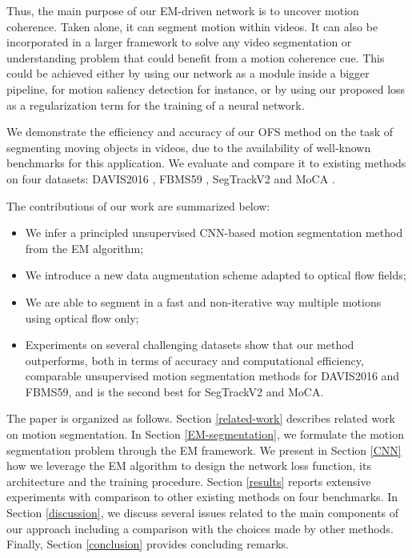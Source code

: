 \documentclass[10pt,twocolumn,letterpaper]{article}
\begin{document}
Thus, the main purpose of our EM-driven network is to uncover motion coherence. Taken alone, it can segment motion within videos. It can also be incorporated in a larger framework to solve any video segmentation or understanding problem {\color{black} that could benefit from a motion coherence cue. This could be achieved either by using our network as a module inside a bigger pipeline, for motion saliency detection for instance, or by using our proposed loss as a regularization term for the training of a neural network.}

We demonstrate the efficiency and accuracy of our OFS method on the task of segmenting moving objects in videos,
due to the availability of well-known benchmarks for this application.
We evaluate and compare it to existing methods on four datasets: DAVIS2016 \cite{pont-tuset_benchmark_2016}, FBMS59 \cite{ochs2014}, SegTrackV2 \cite{li-SegTrackv2-2013} and MoCA \cite{lamdouar_camouflage_2020}.

The contributions of our work are summarized below:
\begin{itemize}
\item We infer a principled unsupervised CNN-based motion segmentation method from the EM algorithm;
\item We introduce a new data augmentation scheme adapted to optical flow fields;
\item We are able to segment in a fast and non-iterative way multiple motions using optical flow only;
\item Experiments on several challenging datasets show that our method outperforms, both in terms of accuracy and computational efficiency, comparable unsupervised motion segmentation methods {\color{black} for DAVIS2016 and FBMS59, and is the second best for SegTrackV2 and MoCA.}
\end{itemize}

The paper is organized as follows. Section \ref{related-work} describes related work on motion segmentation. In Section \ref{EM-segmentation}, we formulate the motion segmentation problem through the EM framework.
We present in Section \ref{CNN} how we leverage the EM algorithm to design {\color{black} the network loss function, its architecture and the training procedure}. Section \ref{results} reports extensive experiments with comparison to other existing methods on four benchmarks. In Section \ref{discussion}, we discuss several issues related to the main components of our approach including a comparison with the choices made by other methods. Finally, Section \ref{conclusion} provides concluding remarks.
\end{document}
